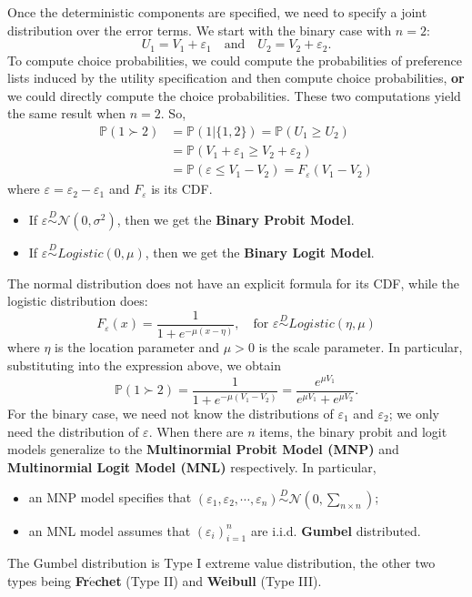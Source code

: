 \documentclass[11pt]{article}
\newcommand{\p}{\mathbb{P}}
\begin{document}
\noindent Once the deterministic components are specified, we need to specify a joint distribution over the error terms. We start with the binary case with $n=2$:
$$U_1=V_1+\varepsilon_1\quad\mbox{and}\quad U_2=V_2+\varepsilon_2.$$
To compute choice probabilities, we could compute the probabilities of preference lists induced by the utility specification and then compute choice probabilities, \textbf{or} we could directly compute the choice probabilities. These two computations yield the same result when $n=2$. So,
\begin{align*}
\p(1\succ2)&=\p(1|\{1,2\})=\p(U_1\geq U_2)\\
&=\p(V_1+\varepsilon_1\geq V_2+\varepsilon_2)\\
&=\p(\varepsilon\leq V_1-V_2)=F_\varepsilon(V_1-V_2)
\end{align*}
where $\varepsilon=\varepsilon_2-\varepsilon_1$ and $F_\varepsilon$ is its CDF.
\newpage
\begin{itemize}
\item If $\varepsilon\overset{D}\sim\mathcal{N}(0,\sigma^2)$, then we get the {\bf Binary Probit Model}.
\item If $\varepsilon\overset{D}\sim Logistic(0,\mu)$, then we get the {\bf Binary Logit Model}.
\end{itemize}
The normal distribution does not have an explicit formula for its CDF, while the logistic distribution does:
$$F_\varepsilon(x)=\frac{1}{1+e^{-\mu(x-\eta)}},\quad\text{for }\varepsilon\overset{D}\sim Logistic(\eta,\mu)$$
where $\eta$ is the location parameter and $\mu>0$ is the scale parameter. In particular, substituting into the expression above, we obtain
$$\p(1\succ2)=\frac{1}{1+e^{-\mu(V_1-V_2)}}=\frac{e^{\mu V_1}}{e^{\mu V_1}+e^{\mu V_2}}.$$
For the binary case, we need not know the distributions of $\varepsilon_1$ and $\varepsilon_2$; we only need the distribution of $\varepsilon$. When there are $n$ items, the binary probit and logit models generalize to the {\bf Multinormial Probit Model (MNP)} and {\bf Multinormial Logit Model (MNL)} respectively. In particular,
\begin{itemize}
\item an MNP model specifies that $(\varepsilon_1,\varepsilon_2,\cdots,\varepsilon_n)\overset{D}\sim\mathcal{N}(0,\sum_{n\times n})$;
\item an MNL model assumes that $(\varepsilon_i)_{i=1}^n$ are i.i.d. \textbf{Gumbel} distributed.
\end{itemize}
The Gumbel distribution is Type I extreme value distribution, the other two types being \textbf{Fr$\acute{\mbox{e}}$chet} (Type II) and \textbf{Weibull} (Type III).
\end{document}
